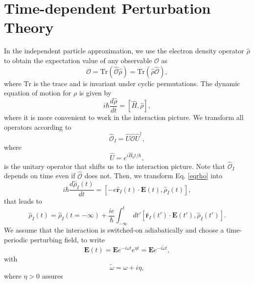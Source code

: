 \section{Time-dependent Perturbation Theory}\label{tdpt}

In the independent particle approximation, we use the electron density
operator $\hat{\rho}$ to obtain the expectation value of any observable
$\mathcal{O}$ as
\begin{equation}\label{traza}
\mathcal{O}=\mathrm{Tr}(\hat{\mathcal{O}}\hat{\rho})=\mathrm{Tr}(\hat{\rho}\hat{\mathcal{O}}),
\end{equation}
where $\mathrm{Tr}$ is the trace and is invariant under cyclic permutations.
The dynamic equation of motion for $\rho$ is given by
\begin{equation}\label{eqrho}
i\hbar \frac{d\hat{\rho}}{dt}=[\hat{H},\hat{\rho}]
,
\end{equation}
where it is more convenient to work in the interaction picture. We transform 
all operators according to 
\begin{equation}\label{ip}
\hat{\mathcal{O}}_I=\hat{U}\hat{\mathcal{O}}\hat{U}^\dagger,
\end{equation}
where
\begin{equation}\label{ou}
\hat{U}=e^{i\hat{H}_0t/\hbar},
\end{equation}
is the unitary operator that shifts us to the interaction picture.
Note that $\hat{\mathcal{O}}_I$ depends on time even if $\hat{\mathcal{O}}$ does not.
Then, we transform Eq. \eqref{eqrho} into
\begin{equation}\label{intrho}
i\hbar\frac{d\hat{\rho}_I(t)}{dt}=[-e\hat{\mathbf{r}}_I(t)\cdot\mathbf{E}(t),\hat{\rho}_I(t)],
\end{equation}
that leads to
\begin{equation}\label{intrho2}
\hat{\rho}_I(t)=\hat{\rho}_I(t=-\infty)
+
\frac{ie}{\hbar}\int_{-\infty}^t dt'[\hat{\mathbf{r}}_I(t')\cdot\mathbf{E}(t'),\hat{\rho}_I(t')].
\end{equation}
We assume that the interaction is switched-on adiabatically and
choose a time-periodic perturbing field, to write
\begin{equation}\label{efield}
\mathbf{E}(t)=\mathbf{E} e^{-i\omega t}e^{\eta t}=\mathbf{E} e^{-i\tilde{\omega} t}
,
\end{equation}
with
\begin{equation}\label{got}
\tilde{\omega}=\omega+i\eta
,
\end{equation} 
where $\eta > 0$ assures
